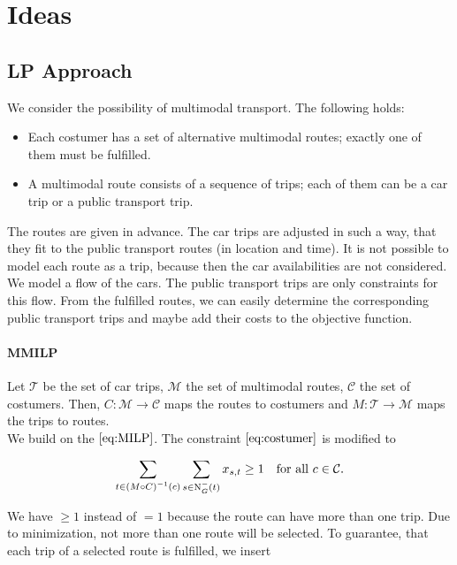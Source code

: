 \section{Ideas}

\subsection{LP Approach}

We consider the possibility of multimodal transport. The following holds:

\begin{itemize}
	\item{Each costumer has a set of alternative multimodal routes; exactly one of them must be fulfilled.}
	\item{A multimodal route consists of a sequence of trips; each of them can be a car trip or a public transport trip.}
\end{itemize}

The routes are given in advance. The car trips are adjusted in such a way, that they fit to the public transport routes (in location and time). It is not possible to model each route as a trip, because then the car availabilities are not considered. \\

We model a flow of the cars. The public transport trips are only constraints for this flow. From the fulfilled routes, we can easily determine the corresponding public transport trips and maybe add their costs to the objective function.

\paragraph{MMILP} \parfill

Let $\mathcal{T}$ be the set of car trips, $\mathcal{M}$ the set of multimodal routes, $\mathcal{C}$ the set of costumers. Then, $C:\mathcal{M}\to\mathcal{C}$ maps the routes to costumers and $M:\mathcal{T}\to\mathcal{M}$ maps the trips to routes. \\

We build on the $\eqref{eq:MILP}$. The constraint $\eqref{eq:costumer}$ is modified to

\begin{align}
	\sum_{t\in\left(M\circ C\right)^{-1}(c)} \sum_{s\in\operatorname{N}_G^-(t)} x_{s,t} \geq 1 & & \text{for all } c\in\mathcal{C}.
\end{align}

We have $\geq 1$ instead of $= 1$ because the route can have more than one trip. Due to minimization, not more than one route will be selected. To guarantee, that each trip of a selected route is fulfilled, we insert

